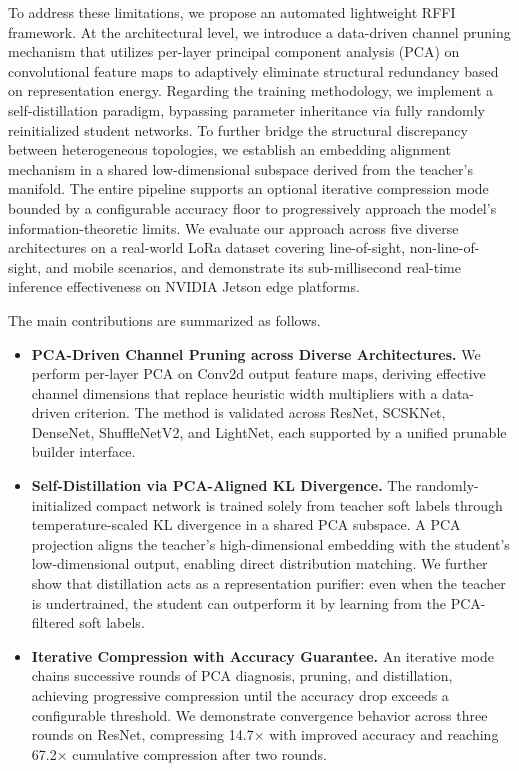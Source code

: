 \documentclass[10pt, conference]{IEEEtran}
\begin{document}
To address these limitations, we propose an automated lightweight RFFI framework. At the architectural level, we introduce a data-driven channel pruning mechanism that utilizes per-layer principal component analysis (PCA) on convolutional feature maps to adaptively eliminate structural redundancy based on representation energy. Regarding the training methodology, we implement a self-distillation paradigm, bypassing parameter inheritance via fully randomly reinitialized student networks. To further bridge the structural discrepancy between heterogeneous topologies, we establish an embedding alignment mechanism in a shared low-dimensional subspace derived from the teacher’s manifold. The entire pipeline supports an optional iterative compression mode bounded by a configurable accuracy floor to progressively approach the model's information-theoretic limits. We evaluate our approach across five diverse architectures on a real-world LoRa dataset covering line-of-sight, non-line-of-sight, and mobile scenarios, and demonstrate its sub-millisecond real-time inference effectiveness on NVIDIA Jetson edge platforms.

The main contributions are summarized as follows.
\begin{itemize}
    \item \textbf{PCA-Driven Channel Pruning across Diverse Architectures.}
    We perform per-layer PCA on Conv2d output feature maps, deriving effective channel dimensions that replace heuristic width multipliers with a data-driven criterion. The method is validated across ResNet, SCSKNet, DenseNet, ShuffleNetV2, and LightNet, each supported by a unified prunable builder interface.

    \item \textbf{Self-Distillation via PCA-Aligned KL Divergence.}
    The randomly-initialized compact network is trained solely from teacher soft labels through temperature-scaled KL divergence in a shared PCA subspace. A PCA projection aligns the teacher's high-dimensional embedding with the student's low-dimensional output, enabling direct distribution matching. We further show that distillation acts as a representation purifier: even when the teacher is undertrained, the student can outperform it by learning from the PCA-filtered soft labels.

    \item \textbf{Iterative Compression with Accuracy Guarantee.}
    An iterative mode chains successive rounds of PCA diagnosis, pruning, and distillation, achieving progressive compression until the accuracy drop exceeds a configurable threshold. We demonstrate convergence behavior across three rounds on ResNet, compressing 14.7$\times$ with improved accuracy and reaching 67.2$\times$ cumulative compression after two rounds.
\end{itemize}
\end{document}
